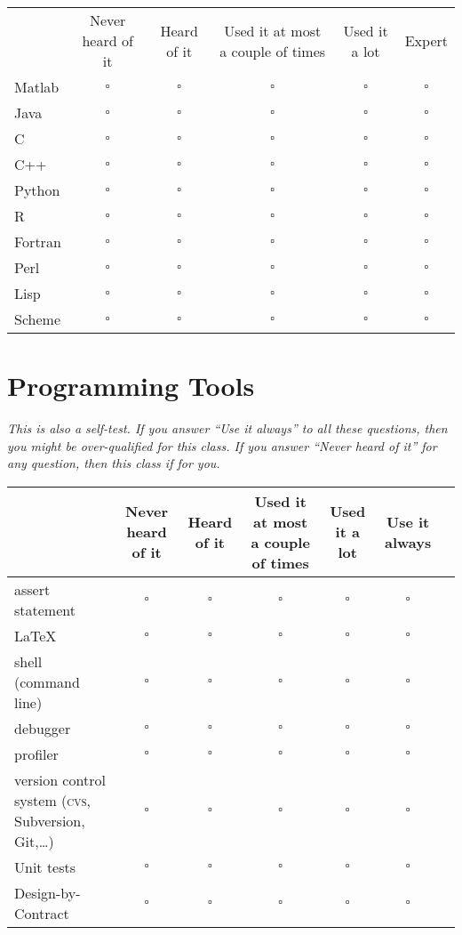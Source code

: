 \documentclass[article,twoside]{memoir}
\newcommand*{\checkbox}{$\square$}
\newcommand{\header}[1]{\textsl{#1}}
\def\th#1{#1}
\begin{document}
\begin{tabular}{lccccc}
 & \th{Never heard of it} & \th{Heard of it} & \th{Used it at most a couple of times} & \th{Used it a lot} & \th{Expert}\\
Matlab  &\checkbox &\checkbox &\checkbox &\checkbox &\checkbox \\
Java    &\checkbox &\checkbox &\checkbox &\checkbox &\checkbox \\
C       &\checkbox &\checkbox &\checkbox &\checkbox &\checkbox \\
C++     &\checkbox &\checkbox &\checkbox &\checkbox &\checkbox \\
Python  &\checkbox &\checkbox &\checkbox &\checkbox &\checkbox \\
R       &\checkbox &\checkbox &\checkbox &\checkbox &\checkbox \\
Fortran &\checkbox &\checkbox &\checkbox &\checkbox &\checkbox \\
Perl    &\checkbox &\checkbox &\checkbox &\checkbox &\checkbox \\
Lisp    &\checkbox &\checkbox &\checkbox &\checkbox &\checkbox \\
Scheme  &\checkbox &\checkbox &\checkbox &\checkbox &\checkbox \\
\end{tabular}

\section{Programming Tools}
\header{This is also a self-test. If you answer ``Use it always'' to all these questions, then you might be over-qualified for this class. If you answer ``Never heard of it'' for any question, then this class if for you.}

\begin{tabular}{lcccccc}
 \toprule
 & \th{Never heard of it} & \th{Heard of it} & \th{Used it at most a couple of times} & \th{Used it a lot} & \th{Use it always}\\
 \midrule
assert statement           &\checkbox &\checkbox &\checkbox &\checkbox &\checkbox \\
\LaTeX                     &\checkbox &\checkbox &\checkbox &\checkbox &\checkbox \\
shell (command line)       &\checkbox &\checkbox &\checkbox &\checkbox &\checkbox \\
debugger                   &\checkbox &\checkbox &\checkbox &\checkbox &\checkbox \\
profiler                   &\checkbox &\checkbox &\checkbox &\checkbox &\checkbox \\
version control system (\textsc{cvs},
Subversion, Git,\dots)     &\checkbox &\checkbox &\checkbox &\checkbox &\checkbox \\
Unit tests                 &\checkbox &\checkbox &\checkbox &\checkbox &\checkbox \\
Design-by-Contract         &\checkbox &\checkbox &\checkbox &\checkbox &\checkbox \\
\end{tabular}
\end{document}
